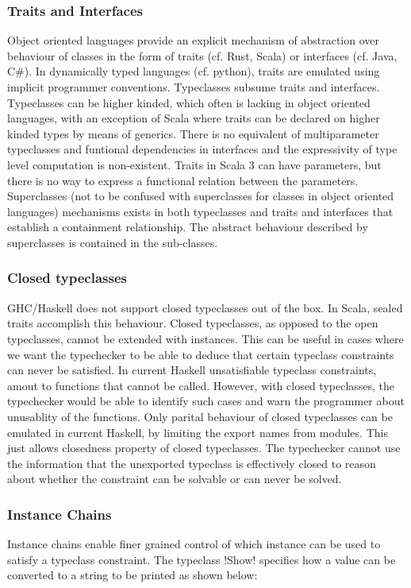 \documentclass[screen,nonacm]{acmart}
\begin{document}
\subsubsection{Traits and Interfaces}
Object oriented languages provide an explicit mechanism of abstraction over behaviour of classes in the form of traits (cf. Rust, Scala) or interfaces (cf. Java, C\#). In dynamically typed languages (cf. python), traits are emulated using implicit programmer conventions. Typeclasses subsume traits and interfaces. Typeclasses can be higher kinded, which often is lacking in object oriented languages, with an exception of Scala where traits can be declared on higher kinded types by means of generics. There is no equivalent of multiparameter typeclasses and funtional dependencies in interfaces and the expressivity of type level computation is non-existent. Traits in Scala 3 can have parameters, but there is no way to express a functional relation between the parameters. Superclasses (not to be confused with superclasses for classes in object oriented languages)  mechanisms exists in both typeclasses and traits and interfaces that establish a containment relationship. The abstract behaviour described by superclasses is contained in the sub-classes.

\subsubsection{Closed typeclasses}
GHC/Haskell does not support closed typeclasses out of the box. In Scala, sealed traits accomplish this behaviour. Closed typeclasses, as opposed to the open typeclasses, cannot be extended with instances. This can be useful in cases where we want the typechecker to be able to deduce that certain typeclass constraints can never be satisfied. In current Haskell unsatisfiable typeclass constraints, amout to functions that cannot be called. However, with closed typeclasses, the typechecker would be able to identify such cases and warn the programmer about unusablity of the functions. Only parital behaviour of closed typeclasses can be emulated in current Haskell, by limiting the export names from modules. This just allows closedness property of closed typeclasses. The typechecker cannot use the information that the unexported typeclass is effectively closed to reason about whether the constraint can be solvable or can never be solved.

\subsubsection{Instance Chains}
Instance chains\cite{morris_instance_2010} enable finer grained control of which instance can be used to satisfy a typeclass constraint. The typeclass !Show! specifies how a value can be converted to a string to be printed as shown below:
\end{document}
